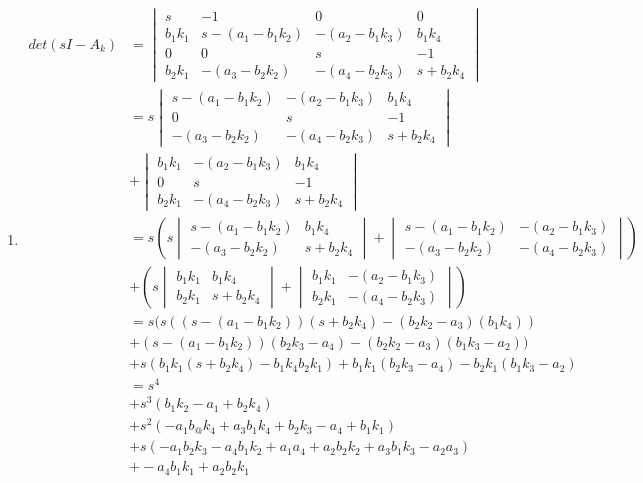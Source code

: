 \documentclass[11pt, twoside, letterpaper]{article}   	%
\begin{document}
\begin{enumerate}
\begin{enumerate}
\item
\begin{align*}
det(sI-A_k) &= 
\begin{vmatrix}
s &-1 &0 &0\\
b_1k_1 &s-(a_1-b_1k_2) &-(a_2-b_1k_3) &b_1k_4\\
0 &0 &s &-1\\
b_2k_1 &-(a_3-b_2k_2) &-(a_4-b_2k_3) &s+b_2k_4
\end{vmatrix}\\
&= s\begin{vmatrix}
s-(a_1-b_1k_2) &-(a_2-b_1k_3) &b_1k_4\\
0 &s &-1\\
-(a_3-b_2k_2) &-(a_4-b_2k_3) &s+b_2k_4
\end{vmatrix}\\
&+
\begin{vmatrix}
b_1k_1 &-(a_2-b_1k_3) &b_1k_4\\
0 &s &-1\\
b_2k_1 &-(a_4-b_2k_3) &s+b_2k_4
\end{vmatrix}\\
&= s(s
\begin{vmatrix}
s-(a_1-b_1k_2) &b_1k_4\\
-(a_3-b_2k_2) &s+b_2k_4
\end{vmatrix}
+
\begin{vmatrix}
s-(a_1-b_1k_2) &-(a_2-b_1k_3) \\
-(a_3-b_2k_2) &-(a_4-b_2k_3) 
\end{vmatrix})\\
&+(s
\begin{vmatrix}
b_1k_1 &b_1k_4\\
b_2k_1 &s+b_2k_4
\end{vmatrix}+
\begin{vmatrix}
b_1k_1 &-(a_2-b_1k_3) \\
b_2k_1 &-(a_4-b_2k_3) 
\end{vmatrix})\\
&=s(s((s-(a_1-b_1k_2))(s+b_2k_4)-(b_2k_2-a_3)(b_1k_4))\\
&+(s-(a_1-b_1k_2))(b_2k_3-a_4)-(b_2k_2-a_3)(b_1k_3-a_2))\\
&+s(b_1k_1(s+b_2k_4)-b_1k_4b_2k_1)+b_1k_1(b_2k_3-a_4)-b_2k_1(b_1k_3-a_2)\\
&=s^4\\
&+ s^3(b_1k_2-a_1+b_2k_4)\\
&+ s^2(-a_1b_@k_4+a_3b_1k_4+b_2k_3-a_4+b_1k_1)\\
&+ s(-a_1b_2k_3-a_4b_1k_2+a_1a_4+a_2b_2k_2+a_3b_1k_3-a_2a_3)\\
&+ -a_4b_1k_1+a_2b_2k_1
\end{align*}


\end{enumerate}
\end{enumerate}
\end{document}
